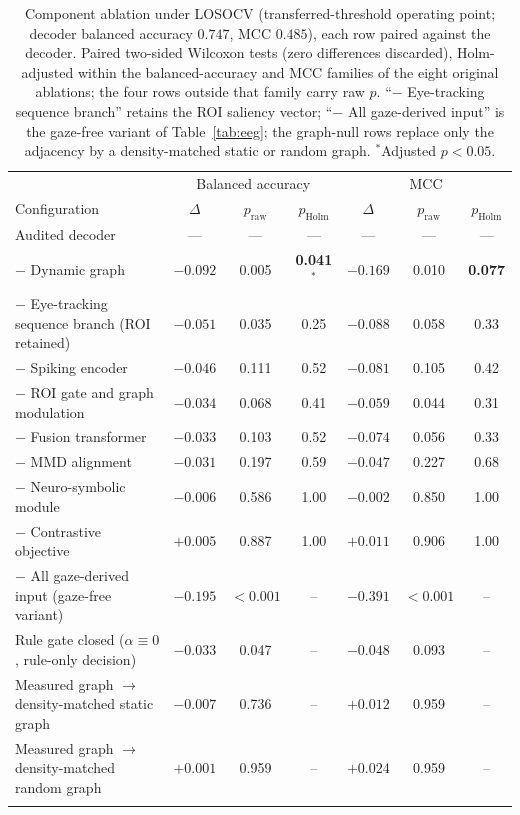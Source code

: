 \documentclass[pdflatex,sn-basic,Numbered,twocolumn,iicol]{sn-jnl}
\theoremstyle{thmstyleone}%
\theoremstyle{thmstyletwo}%
\theoremstyle{thmstylethree}%
\begin{document}
\begin{table}[!htbp]
\caption{Component ablation under LOSOCV (transferred-threshold operating point; decoder balanced accuracy $0.747$, MCC $0.485$), each row paired against the decoder. Paired two-sided Wilcoxon tests (zero differences discarded), Holm-adjusted within the balanced-accuracy and MCC families of the eight original ablations; the four rows outside that family carry raw $p$. ``$-$ Eye-tracking sequence branch'' retains the ROI saliency vector; ``$-$ All gaze-derived input'' is the gaze-free variant of Table~\ref{tab:eeg}; the graph-null rows replace only the adjacency by a density-matched static or random graph. $^{*}$Adjusted $p<0.05$.}\label{tab:abl}
\small
\begin{tabular*}{\linewidth}{@{\extracolsep{\fill}}lcccccc@{}}
\toprule
& \multicolumn{3}{c}{Balanced accuracy} & \multicolumn{3}{c}{MCC} \\
Configuration & $\Delta$ & $p_{\mathrm{raw}}$ & $p_{\mathrm{Holm}}$ & $\Delta$ & $p_{\mathrm{raw}}$ & $p_{\mathrm{Holm}}$ \\
\midrule
Audited decoder & --- & --- & --- & --- & --- & --- \\
$-$ Dynamic graph & $-0.092$ & 0.005 & \textbf{0.041}$^{*}$ & $-0.169$ & 0.010 & \textbf{0.077} \\
$-$ Eye-tracking sequence branch (ROI retained) & $-0.051$ & 0.035 & 0.25 & $-0.088$ & 0.058 & 0.33 \\
$-$ Spiking encoder & $-0.046$ & 0.111 & 0.52 & $-0.081$ & 0.105 & 0.42 \\
$-$ ROI gate and graph modulation & $-0.034$ & 0.068 & 0.41 & $-0.059$ & 0.044 & 0.31 \\
$-$ Fusion transformer & $-0.033$ & 0.103 & 0.52 & $-0.074$ & 0.056 & 0.33 \\
$-$ MMD alignment & $-0.031$ & 0.197 & 0.59 & $-0.047$ & 0.227 & 0.68 \\
$-$ Neuro-symbolic module & $-0.006$ & 0.586 & 1.00 & $-0.002$ & 0.850 & 1.00 \\
$-$ Contrastive objective & $+0.005$ & 0.887 & 1.00 & $+0.011$ & 0.906 & 1.00 \\
\midrule
$-$ All gaze-derived input (gaze-free variant) & $-0.195$ & $<0.001$ & -- & $-0.391$ & $<0.001$ & -- \\
Rule gate closed ($\alpha\equiv0$, rule-only decision) & $-0.033$ & 0.047 & -- & $-0.048$ & 0.093 & -- \\
Measured graph $\to$ density-matched static graph & $-0.007$ & 0.736 & -- & $+0.012$ & 0.959 & -- \\
Measured graph $\to$ density-matched random graph & $+0.001$ & 0.959 & -- & $+0.024$ & 0.959 & -- \\
\botrule
\end{tabular*}
\end{table}
\end{document}

